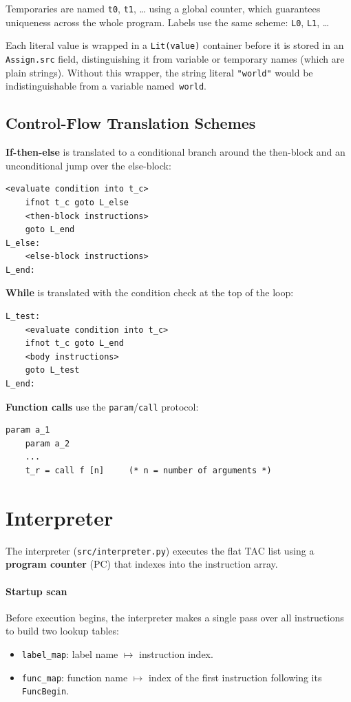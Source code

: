\documentclass[12pt,a4paper]{report}
\begin{document}
Temporaries are named \texttt{t0}, \texttt{t1}, \ldots{} using a global
counter, which guarantees uniqueness across the whole program. Labels use the
same scheme: \texttt{L0}, \texttt{L1}, \ldots{}

Each literal value is wrapped in a \texttt{Lit(value)} container before
it is stored in an \texttt{Assign.src} field, distinguishing it from
variable or temporary names (which are plain strings).
Without this wrapper, the string literal \texttt{"world"} would be
indistinguishable from a variable named~\texttt{world}.

\subsection{Control-Flow Translation Schemes}

\textbf{If-then-else} is translated to a conditional branch around the
then-block and an unconditional jump over the else-block:

\begin{lstlisting}[style=tacstyle, numbers=none]
    <evaluate condition into t_c>
    ifnot t_c goto L_else
    <then-block instructions>
    goto L_end
L_else:
    <else-block instructions>
L_end:
\end{lstlisting}

\textbf{While} is translated with the condition check at the top of the loop:

\begin{lstlisting}[style=tacstyle, numbers=none]
L_test:
    <evaluate condition into t_c>
    ifnot t_c goto L_end
    <body instructions>
    goto L_test
L_end:
\end{lstlisting}

\textbf{Function calls} use the \texttt{param}/\texttt{call} protocol:

\begin{lstlisting}[style=tacstyle, numbers=none]
    param a_1
    param a_2
    ...
    t_r = call f [n]     (* n = number of arguments *)
\end{lstlisting}

\section{Interpreter}

The interpreter (\texttt{src/interpreter.py}) executes the flat TAC list
using a \textbf{program counter} (PC) that indexes into the instruction array.

\paragraph{Startup scan}
Before execution begins, the interpreter makes a single pass over all
instructions to build two lookup tables:
\begin{itemize}
  \item \texttt{label\_map}: label name $\mapsto$ instruction index.
  \item \texttt{func\_map}: function name $\mapsto$ index of the first
        instruction following its \texttt{FuncBegin}.
\end{itemize}
\end{document}
